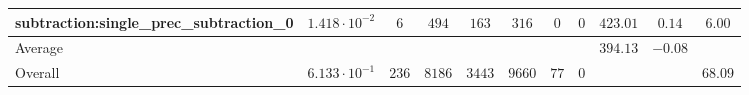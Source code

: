 \begin{tabular}{|l|c|c|c|c|c|c|c|c|c|c|}
subtraction:single\_prec\_subtraction\_0         & $ 1.418 \cdot 10^{-2} $ & $ 6      $ & $ 494  $ & $ 163  $ & $ 316   $ & $ 0  $ & $ 0 $ & $ 423.01      $ & $ 0.14    $ & $ 6.00    $ \\
\hline
Average                                          & $                     $ & $        $ & $      $ & $      $ & $       $ & $    $ & $   $ & $ 394.13      $ & $ -0.08   $ & $         $ \\
\hline
Overall                                          & $ 6.133 \cdot 10^{-1} $ & $ 236    $ & $ 8186 $ & $ 3443 $ & $ 9660  $ & $ 77 $ & $ 0 $ & $             $ & $         $ & $ 68.09   $ \\
\hline
\end{tabular}
